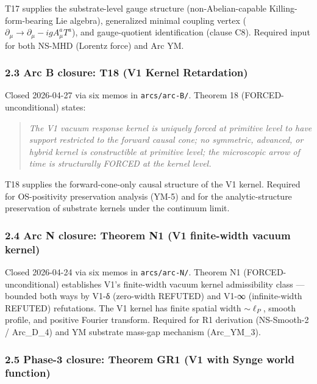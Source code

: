 \documentclass[
  11pt,
  a4paper,
]{article}
\begin{document}
T17 supplies the substrate-level gauge structure (non-Abelian-capable
Killing-form-bearing Lie algebra), generalized minimal coupling vertex
(\(\partial_\mu \to \partial_\mu - igA_\mu^a T^a\)), and gauge-quotient
identification (clause C8). Required input for both NS-MHD (Lorentz
force) and Arc YM.

\subsubsection{2.3 Arc B closure: T18 (V1 Kernel
Retardation)}\label{arc-b-closure-t18-v1-kernel-retardation}

Closed 2026-04-27 via six memos in \texttt{arcs/arc-B/}. Theorem 18
(FORCED-unconditional) states:

\begin{quote}
\emph{The V1 vacuum response kernel is uniquely forced at primitive
level to have support restricted to the forward causal cone; no
symmetric, advanced, or hybrid kernel is constructible at primitive
level; the microscopic arrow of time is structurally FORCED at the
kernel level.}
\end{quote}

T18 supplies the forward-cone-only causal structure of the V1 kernel.
Required for OS-positivity preservation analysis (YM-5) and for the
analytic-structure preservation of substrate kernels under the continuum
limit.

\subsubsection{2.4 Arc N closure: Theorem N1 (V1 finite-width vacuum
kernel)}\label{arc-n-closure-theorem-n1-v1-finite-width-vacuum-kernel}

Closed 2026-04-24 via six memos in \texttt{arcs/arc-N/}. Theorem N1
(FORCED-unconditional) establishes V1's finite-width vacuum kernel
admissibility class --- bounded both ways by V1-δ (zero-width REFUTED)
and V1-∞ (infinite-width REFUTED) refutations. The V1 kernel has finite
spatial width \(\sim\ell_P\), smooth profile, and positive Fourier
transform. Required for R1 derivation (NS-Smooth-2 / Arc\_D\_4) and YM
substrate mass-gap mechanism (Arc\_YM\_3).

\subsubsection{2.5 Phase-3 closure: Theorem GR1 (V1 with Synge world
function)}\label{phase-3-closure-theorem-gr1-v1-with-synge-world-function}
\end{document}
